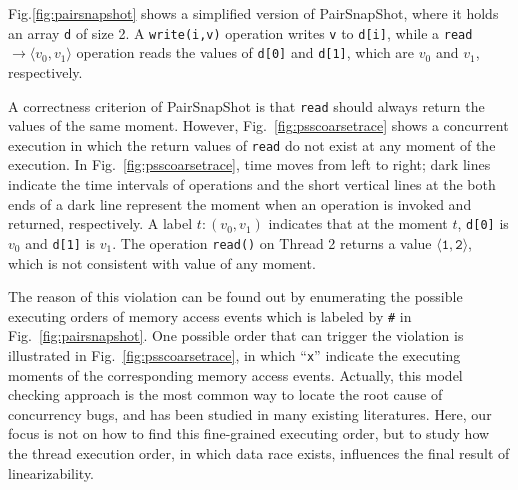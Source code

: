 \documentclass[runningheads]{llncs}
\newcommand{\pair}[1]{{\langle{#1}\rangle}}
\begin{document}
Fig.\ref{fig:pairsnapshot} shows a simplified version of PairSnapShot, where it holds an array \texttt{d} of size 2. A \texttt{write(i,v)} operation writes \texttt{v} to \texttt{d[i]}, while a \texttt{read} \texttt{$\to \langle v_0,v_1\rangle$} operation reads the values of \texttt{d[0]} and \texttt{d[1]}, which are $v_0$ and $v_1$, respectively.

 A correctness criterion of PairSnapShot is that \texttt{read} should always return the values of the same moment. However, 
Fig.~\ref{fig:psscoarsetrace} shows a concurrent execution in which the return values of \texttt{read} do not exist at any moment of the execution. 
In Fig.~\ref{fig:psscoarsetrace}, time moves from left to right; dark lines indicate the time intervals of operations and  
the short vertical lines at the both ends of a dark line represent the moment when an operation is invoked and returned, respectively.
A label ${t:(v_0,v_1)}$ indicates that at the moment $t$,  \texttt{d[0]} is $v_0$ and \texttt{d[1]} is $v_1$.
  The operation \texttt{read()} on Thread 2 returns a value $\mathtt{\pair{1,2}}$,
  which is not consistent with value of any moment. 

The reason of this violation can be found out by enumerating the possible executing orders of memory access events which is labeled by \texttt{\#} in Fig.~\ref{fig:pairsnapshot}. 
One possible order that can trigger the violation is illustrated in Fig.~\ref{fig:psscoarsetrace}, in which ``\texttt{x}'' indicate the executing moments of the corresponding memory access events. 
Actually, this model checking approach is the most common way to locate the root cause of concurrency bugs, and has been studied in many existing literatures.
Here, our focus is not on how to find this fine-grained executing order, but to study how the thread execution order, in which data race exists, influences the final result of linearizability.

\end{document}

